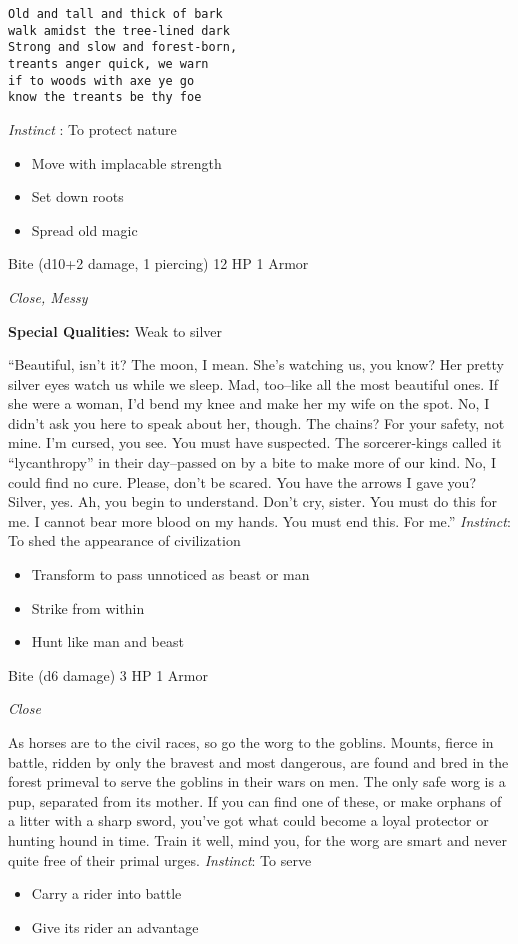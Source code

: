 \HRule
\begin{verbatim}
Old and tall and thick of bark
walk amidst the tree-lined dark
Strong and slow and forest-born,
treants anger quick, we warn
if to woods with axe ye go
know the treants be thy foe
\end{verbatim}
\emph{Instinct}
: To protect nature
\begin{itemize}
\item Move with implacable strength
\item Set down roots
\item Spread old magic
\end{itemize}
\newpage
\HRule
{}

Bite (d10+2 damage, 1 piercing)\hspace*{\fill} 12 HP 1 Armor

\emph{Close, Messy}

\textbf{Special Qualities:}
Weak to silver

\HRule
``Beautiful, isn't it? The moon, I mean. She's watching us, you know? Her pretty silver eyes watch us while we sleep. Mad, too--like all the most beautiful ones. If she were a woman, I'd bend my knee and make her my wife on the spot. No, I didn't ask you here to speak about her, though. The chains? For your safety, not mine. I'm cursed, you see. You must have suspected. The sorcerer-kings called it ``lycanthropy'' in their day--passed on by a bite to make more of our kind. No, I could find no cure. Please, don't be scared. You have the arrows I gave you? Silver, yes. Ah, you begin to understand. Don't cry, sister. You must do this for me. I cannot bear more blood on my hands. You must end this. For me.'' \emph{Instinct}: To shed the appearance of civilization
\begin{itemize}
\item Transform to pass unnoticed as beast or man
\item Strike from within
\item Hunt like man and beast
\end{itemize}

\HRule
{}

Bite (d6 damage)\hspace*{\fill} 3 HP 1 Armor

\emph{Close}

\HRule
As horses are to the civil races, so go the worg to the goblins. Mounts, fierce in battle, ridden by only the bravest and most dangerous, are found and bred in the forest primeval to serve the goblins in their wars on men. The only safe worg is a pup, separated from its mother. If you can find one of these, or make orphans of a litter with a sharp sword, you've got what could become a loyal protector or hunting hound in time. Train it well, mind you, for the worg are smart and never quite free of their primal urges. \emph{Instinct}: To serve
\begin{itemize}
\item Carry a rider into battle
\item Give its rider an advantage
\end{itemize}
